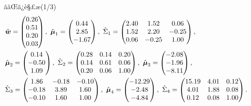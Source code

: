 \documentclass[dvipdfmx]{beamer} %
\newcommand{\bm}[1]{\mbox{\boldmath $#1$}}
\begin{document}
\begin{frame}{ããŒã¿è§£æ(1/3)}
\vspace{-0.2cm}
\footnotesize %
\begin{equation*}
\begin{split}
&\hat {\bm w} = \begin{pmatrix} 0.26 \\ 0.51 \\ 0.20 \\ 0.03 \\ \end{pmatrix},\ 
\hat{\bm \mu}_1 = \begin{pmatrix} 0.44 \\ 2.85 \\ -1.67 \\ \end{pmatrix},\ 
\hat \Sigma_1 = \begin{pmatrix}  2.40 & 1.52 &  0.06 \\ 1.52 & 2.20 & -0.25 \\ 0.06 & -0.25 &1.00 \\ \end{pmatrix},\\ 
&\hat{\bm \mu}_2 = \begin{pmatrix} 0.14 \\ -0.50 \\ 1.09 \\ \end{pmatrix},\ 
\hat \Sigma_2 = \begin{pmatrix}   0.28  & 0.14 &  0.20 \\ 0.14 & 0.61 & 0.06 \\  0.20 & 0.06 &1.00 \\ \end{pmatrix},\ 
\hat{\bm \mu}_3 = \begin{pmatrix} -2.08  \\ -1.96 \\ -8.11 \\ \end{pmatrix},\\ 
&\hat \Sigma_3 = \begin{pmatrix}  1.86  & -0.18 &  -0.10 \\-0.18 & 3.89 & 1.60 \\  -0.10 & 1.60 & 1.00 \\ \end{pmatrix},\ 
\hat{\bm \mu}_4 = \begin{pmatrix} -12.29   \\ -2.48 \\ -4.84 \\ \end{pmatrix},\ 
\hat \Sigma_4 = \begin{pmatrix} 15.19 & 4.01 &  0.12 \\ 4.01 & 1.88 & 0.08 \\ 0.12 & 0.08 &1.00 \\ \end{pmatrix}.
\end{split}
\end{equation*}
\normalsize
\end{frame}
\end{document}
